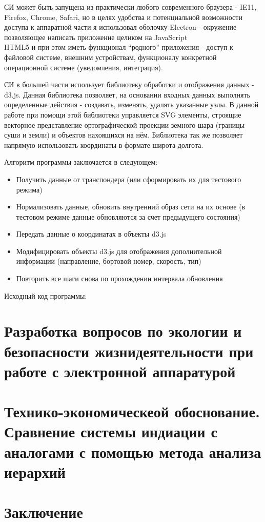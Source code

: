 \documentclass[a4paper,12pt]{report} %
\begin{document}
СИ может быть запущена из практически любого современного браузера - IE11,
Firefox, Chrome, Safari, но в целях удобства и потенциальной возможности доступа
к аппаратной части я использовал оболочку Electron - окружение позволяющее
написать приложение целиком на JavaScript\\HTML5 и при этом иметь функционал
``родного'' приложения - доступ к файловой системе, внешним устройствам,
функционалу конкретной операционной системе (уведомления, интеграция).

СИ в большей части использует библиотеку обработки и отображения данных - d3.js.
Данная библиотека позволяет, на основании входных данных выполнять определенные
действия - создавать, изменять, удалять указанные узлы. В данной работе при
помощи этой библиотеки управляется SVG элементы, строящие векторное
представление ортографической проекции земного шара (границы суши и земли) и
объектов нахоящихся на нём. Библиотека так же позволяет напрямую использовать
координаты в формате широта-долгота.

Алгоритм программы заключается в следующем:
\begin{itemize}
\item Получить данные от транспондера (или сформировать их для тестового режима)
\item Нормализовать данные, обновить внутренний образ сети на их основе (в
  тестовом режиме данные обновляются за счет предыдущего состояния)
\item Передать данные о координатах в объекты d3.js
\item Модифицировать объекты d3.js для отображения дополнительной информации
  (направление, бортовой номер, скорость, тип)
\item Повторить все шаги снова по прохождении интервала обновления
\end{itemize}
\newpage

Исходный код программы:




\section{Разработка вопросов по экологии и безопасности жизнидеятельности при
  работе с электронной \newline аппаратурой} %
\lipsum [1]
\newpage
\section{Технико-экономическеой обоснование. Сравнение системы индиации с
  аналогами с помощью метода анализа иерархий} %
\lipsum [1]
\newpage
\section{Заключение}
\end{document}
